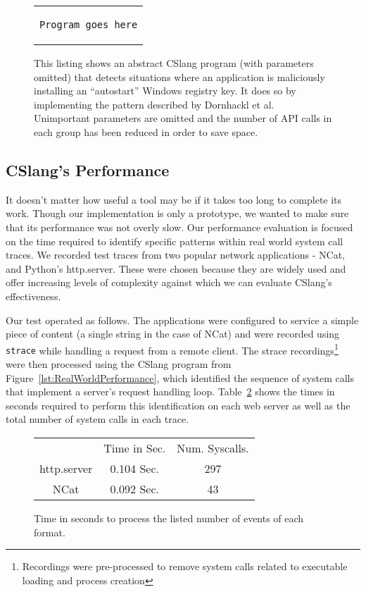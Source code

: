 \begin{figure}[H]
\centering
\begin{tabular}{c}
\begin{lstlisting}
Program goes here
\end{lstlisting}
\end{tabular}
  \caption{This listing shows an abstract CSlang program (with parameters
  omitted) that detects situations where an application is maliciously
  installing an ``autostart'' Windows registry key.  It does so by
  implementing the pattern described by Dornhackl et al.  Unimportant
  parameters are omitted and the number of API calls in each group has been
  reduced in order to save space.}
\label{lst:CSlangRegDetect}
\end{figure}


\subsection{CSlang's Performance}

It doesn't matter how useful a tool may be
if it takes too long to complete its work.
Though our implementation is
only a prototype, we wanted to make sure that its performance was not
overly slow.
Our performance evaluation
is focused on the time required
to identify specific
patterns within real world system call traces.
We recorded test traces
from two popular network applications -
NCat,
and
Python's http.server.
These
were chosen because they are widely used and
offer increasing levels of complexity against which we can evaluate
CSlang's effectiveness.

Our test operated as follows.  The applications were configured to service
a simple piece of content (a single string in the case of NCat) and were
recorded using {\tt strace} while handling a request from a remote client.
The strace
recordings\footnote{Recordings were pre-processed to remove system calls
related to executable loading and process creation} were then processed using the CSlang program from
Figure~\ref{lst:RealWorldPerformance},  which
identified the sequence of system calls that implement
a server's request handling
loop.  Table~\ref{tbl:RealWorldPerformance}
shows the times in seconds required to perform this identification on each
web server as well as the total number of system calls in each trace.

\begin{figure}
  \begin{tabular}{|c|c|c}
                & Time in Sec. & Num. Syscalls.\\
  http.server   & 0.104 Sec.   & 297   \\
  NCat          & 0.092 Sec.   & 43      \\
\end{tabular}
\caption{Time in seconds to process the listed number of events of each format.}
\label{tbl:RealWorldPerformance}
\end{figure}


